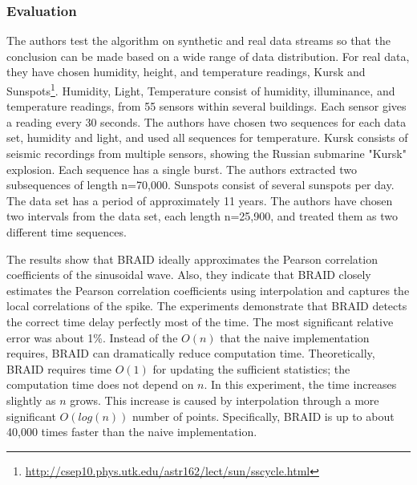 \subsubsection{Evaluation}
The authors test the algorithm on synthetic and real data streams so that the conclusion can be made based on a wide range of data distribution. For real data, they have chosen humidity, height, and temperature readings, Kursk and Sunspots\footnote{\href{http://csep10.phys.utk.edu/astr162/lect/sun/sscycle.html}{http://csep10.phys.utk.edu/astr162/lect/sun/sscycle.html}}. Humidity, Light, Temperature consist of humidity, illuminance, and temperature readings, from 55 sensors within several buildings. Each sensor gives a reading every 30 seconds. The authors have chosen two sequences for each data set, humidity and light, and used all sequences for temperature. Kursk consists of seismic recordings from multiple sensors, showing the Russian submarine "Kursk" explosion. Each sequence has a single burst. The authors extracted two subsequences of length n=70,000. Sunspots consist of several sunspots per day. The data set has a period of approximately 11 years. The authors have chosen two intervals from the data set, each length n=25,900, and treated them as two different time sequences.\newline

The results show that BRAID ideally approximates the Pearson correlation coefficients of the sinusoidal wave. Also, they indicate that BRAID closely estimates the Pearson correlation coefficients using interpolation and captures the local correlations of the spike. The experiments demonstrate that BRAID detects the correct time delay perfectly most of the time. The most significant relative error was about 1\%. Instead of the $O(n)$ that the naive implementation requires, BRAID can dramatically reduce computation time. Theoretically, BRAID requires time $O(1)$ for updating the sufficient statistics; the computation time does not depend on $n$. In this experiment, the time increases slightly as $n$ grows. This increase is caused by interpolation through a more significant $O(log(n))$ number of points. Specifically, BRAID is up to about 40,000 times faster than the naive implementation.